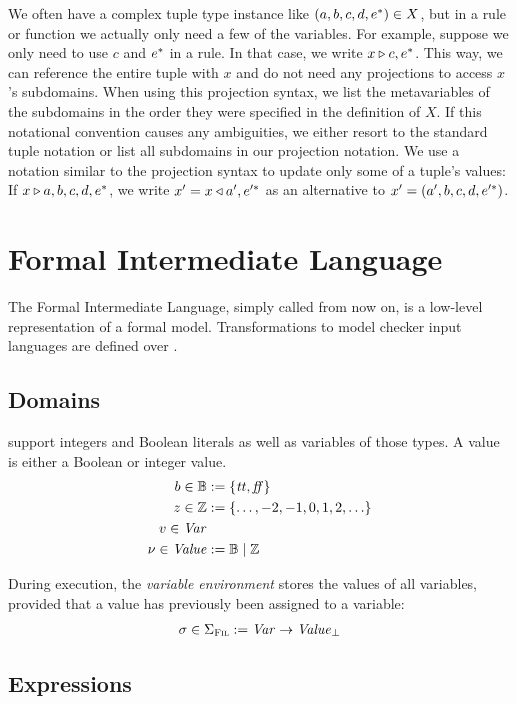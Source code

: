 \documentclass[a4paper,10pt,english]{article}
\begin{document}
	We often have a complex tuple type instance like $(a, b, c, d, e^*) \in X$, but in a rule or
	function we actually only need a few of the variables. For example, suppose we only need to use $c$ and $e^*$ in a rule. In that case,
	we write $x \triangleright c, e^*$.
	This way, we can reference the entire tuple with $x$ and do not need any projections to access $x$'s subdomains. When using this projection syntax, we list the
	metavariables of the subdomains in the order they were specified in the definition of $X$. If this notational convention causes any ambiguities, we either
	resort to the standard tuple notation or list all subdomains in our projection notation. We use a notation similar to the
	projection syntax to update only some of a tuple's values: If $x \triangleright a, b, c, d, e^*$, we write $x' = x
	\triangleleft a', e'^*$ as an alternative to $x' = (a', b, c, d, e'^*)$.  

\section{Formal Intermediate Language}
The Formal Intermediate Language, simply called \Fil from now on, is a low-level representation of a formal model. Transformations
to model checker input languages are defined over \Fil.
\subsection{Domains}

\Fil support integers and Boolean literals as well as variables of those types. A value is either a Boolean or integer
value.
\begin{align*}
    b \in \mathbb{B} &:= \{ \mathit{tt}, \mathit{ff} \}
    \\
    z \in \mathbb{Z} &:= \{ \ldots, -2, -1, 0, 1, 2, \ldots \}
    \\
    v \in \mathit{Var}
    \\
    \nu \in \mathit{Value} &:= \mathbb{B} \mid \mathbb{Z}
\end{align*}

During execution, the \textit{variable environment} stores the values of all variables, provided that a value has previously been
assigned to a variable:
\begin{align*}
	\sigma \in \Sigma_\textsc{Fil} := \mathit{Var} \rightarrow \mathit{Value}_\bot
\end{align*}

\subsection{Expressions}
\end{document}
